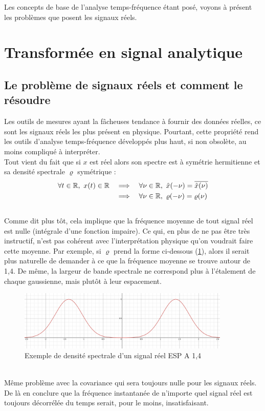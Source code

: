 Les concepts de base de l'analyse temps-fréquence étant posé, voyons à présent les problèmes que posent les signaux réels.


\section{Transformée en signal analytique}

\subsection{Le problème de signaux réels et comment le résoudre}\label{subsec:transfo_SA}


Les outils de mesures ayant la fâcheuses tendance à fournir des données réelles, ce sont les signaux réels les plus présent en physique.
Pourtant, cette propriété rend les outils d'analyse temps-fréquence développés plus haut, si non obsolète, au moins compliqué à interpréter.
\\
Tout vient du fait que si $x$ est réel alors son spectre est à symétrie hermitienne et sa densité spectrale $\varrho$ symétrique :
\begin{align*}
\forall t\in\R,\ x(t)\in\R \quad &\Lr \quad \forall \nu\in\R,\ \hat{x}(-\nu) = \congu{\hat{x}(\nu)} \\
	&\Lr \quad \forall \nu\in\R,\ \varrho(-\nu) = \varrho(\nu)
\end{align*}
\\

Comme dit plus tôt, cela implique que la fréquence moyenne de tout signal réel est nulle (intégrale d'une fonction impaire). Ce qui, en plus de ne pas être très instructif, n'est pas cohérent avec l'interprétation physique qu'on voudrait faire cette moyenne. Par exemple, si $\varrho$ prend la forme ci-dessous (\cref{fig:densi_spec_sym}), alors il serait plus naturelle de demander à ce que la fréquence moyenne se trouve autour de 1,4. De même, la largeur de bande spectrale ne correspond plus à l'étalement de chaque gaussienne, mais plutôt à leur espacement.
\\
\begin{figure}[h]\centering
	\includegraphics[width=0.9\textwidth]{fig/densi_spec_sym}
	\caption{Exemple de densité spectrale d'un signal réel ESP A 1,4}
	\label{fig:densi_spec_sym}
\end{figure}
\\
Même problème avec la covariance qui sera toujours nulle pour les signaux réels. De là en conclure que la fréquence instantanée de n'importe quel signal réel est toujours décorrélée du temps serait, pour le moins, insatisfaisant.
\\

